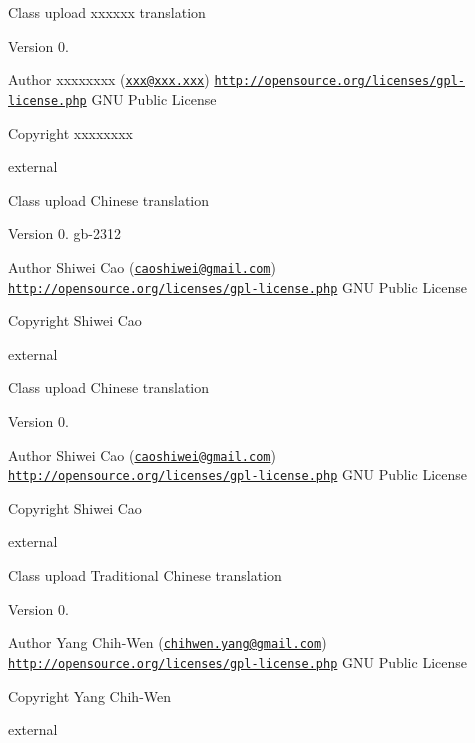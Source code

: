 Class upload xxxxxx translation

\begin{DoxyVersion}{Version}
0. 
\end{DoxyVersion}
\begin{DoxyAuthor}{Author}
xxxxxxxx (\href{mailto:xxx@xxx.xxx}{\tt xxx@xxx.\+xxx})  \href{http://opensource.org/licenses/gpl-license.php}{\tt http\+://opensource.\+org/licenses/gpl-\/license.\+php} G\+N\+U Public License 
\end{DoxyAuthor}
\begin{DoxyCopyright}{Copyright}
xxxxxxxx
\end{DoxyCopyright}
external

Class upload Chinese translation

\begin{DoxyVersion}{Version}
0.  gb-\/2312 
\end{DoxyVersion}
\begin{DoxyAuthor}{Author}
Shiwei Cao (\href{mailto:caoshiwei@gmail.com}{\tt caoshiwei@gmail.\+com})  \href{http://opensource.org/licenses/gpl-license.php}{\tt http\+://opensource.\+org/licenses/gpl-\/license.\+php} G\+N\+U Public License 
\end{DoxyAuthor}
\begin{DoxyCopyright}{Copyright}
Shiwei Cao
\end{DoxyCopyright}
external

Class upload Chinese translation

\begin{DoxyVersion}{Version}
0. 
\end{DoxyVersion}
\begin{DoxyAuthor}{Author}
Shiwei Cao (\href{mailto:caoshiwei@gmail.com}{\tt caoshiwei@gmail.\+com})  \href{http://opensource.org/licenses/gpl-license.php}{\tt http\+://opensource.\+org/licenses/gpl-\/license.\+php} G\+N\+U Public License 
\end{DoxyAuthor}
\begin{DoxyCopyright}{Copyright}
Shiwei Cao
\end{DoxyCopyright}
external

Class upload Traditional Chinese translation

\begin{DoxyVersion}{Version}
0. 
\end{DoxyVersion}
\begin{DoxyAuthor}{Author}
Yang Chih-\/\+Wen (\href{mailto:chihwen.yang@gmail.com}{\tt chihwen.\+yang@gmail.\+com})  \href{http://opensource.org/licenses/gpl-license.php}{\tt http\+://opensource.\+org/licenses/gpl-\/license.\+php} G\+N\+U Public License 
\end{DoxyAuthor}
\begin{DoxyCopyright}{Copyright}
Yang Chih-\/\+Wen
\end{DoxyCopyright}
external 